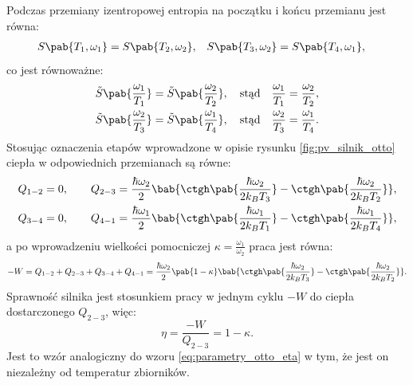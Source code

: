 Podczas przemiany izentropowej entropia na początku i końcu przemianu jest równa:
\begin{align*}
	S\pab{T_1,\omega_1} &= S\pab{T_2,\omega_2}, &
	S\pab{T_3,\omega_2} &= S\pab{T_4,\omega_1},
\end{align*}
co jest równoważne:
\begin{equation}\label{eq:endo_otto__osc_harm_omegaT}
\begin{split}
\tilde{S}\pab{\frac{\omega_1}{T_1}} = \tilde{S}\pab{\frac{\omega_2}{T_2}}, \quad\text{stąd}\quad
\frac{\omega_1}{T_1} = \frac{\omega_2}{T_2}, \\
\tilde{S}\pab{\frac{\omega_2}{T_3}} = \tilde{S}\pab{\frac{\omega_1}{T_4}}, \quad\text{stąd}\quad
\frac{\omega_2}{T_3} = \frac{\omega_1}{T_4}.
\end{split}
\end{equation}
Stosując oznaczenia etapów wprowadzone w opisie rysunku \ref{fig:pv_silnik_otto} ciepła w odpowiednich przemianach są równe:
\begin{equation}
\begin{split}
	Q_{1-2} = 0, \qquad
	Q_{2-3} &= \frac{\hbar\omega_2}{2} \bab{
	\ctgh\pab{\frac{\hbar\omega_2}{2k_B T_3}} -
	\ctgh\pab{\frac{\hbar\omega_2}{2k_B T_2}}}, \\
	Q_{3-4} = 0, \qquad
	Q_{4-1} &= \frac{\hbar\omega_1}{2} \bab{
	\ctgh\pab{\frac{\hbar\omega_1}{2k_B T_1}} -
	\ctgh\pab{\frac{\hbar\omega_1}{2k_B T_4}}},
\end{split}
\end{equation}
a po wprowadzeniu wielkości pomocniczej \(\kappa = \frac{\omega_1}{\omega_2}\) praca jest równa:
\begin{equation}
	- W = Q_{1-2} + Q_{2-3} + Q_{3-4} + Q_{4-1} = \\
	\frac{\hbar\omega_2}{2} \pab{1 - \kappa} \bab{
	\ctgh\pab{\frac{\hbar\omega_2}{2k_B T_3}} -
	\ctgh\pab{\frac{\hbar\omega_2}{2k_B T_2}}}.
\end{equation}
Sprawność silnika jest stosunkiem pracy w jednym cyklu \(- W\) do ciepła dostarczonego \(Q_{2-3}\), więc:
\begin{equation}\label{eq:sprawnosc_kwantowy_otto}
	\eta = \frac{- W}{Q_{2-3}} = 1 - \kappa.
\end{equation}
Jest to wzór analogiczny do wzoru \eqref{eq:parametry_otto_eta} w tym, że jest on niezależny od temperatur zbiorników.

